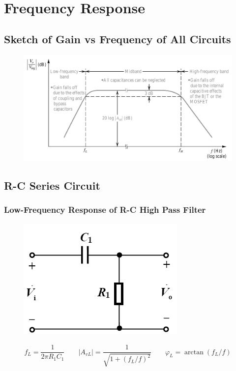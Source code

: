 \chapter{Frequency Response}

\section{Sketch of Gain vs Frequency of All Circuits }

\begin{figure}[H]
  \centering
  \includegraphics[width=0.9\linewidth]{figures/Frequency-Response}
\end{figure}

\section{R-C Series Circuit}

\subsection{Low-Frequency Response of R-C High Pass Filter}

\begin{figure}[H]
  \centering
  \includegraphics[width=0.3\linewidth]{figures/R-C-High}
\end{figure}

\begin{equation*}
  \begin{aligned}
    f_L = \dfrac{1}{2 \pi R_1 C_1} \quad\quad \left| A_{vL} \right| = \dfrac{1}{\sqrt{1 + \left( f_L / f \right)^2}} \quad\quad \varphi_L = \arctan \left( f_L / f \right)
  \end{aligned}
\end{equation*}

